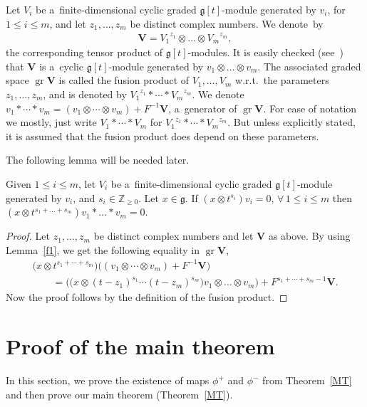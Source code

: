 \documentclass[pdftex]{sigma}
\DeclareMathOperator{\gr}{gr}
\numberwithin{equation}{section}
\begin{document}
Let $V_i$ be a~f\/inite-dimensional cyclic graded $\mathfrak{g}[t]$-module generated by $v_i$, for $1\leq i\leq m$, and
let $z_1,\dots,z_m$ be distinct complex numbers.
We denote~by
\begin{gather*}
\mathbf{V}={V_1}^{z_1}\otimes\dots\otimes {V_m}^{z_m},
\end{gather*}
the corresponding tensor product of $\mathfrak{g}[t]$-modules.
It is easily checked (see~\cite[Proposition 1.4]{FL}) that $\mathbf{V}$ is a~cyclic $\mathfrak{g}[t]$-module generated
by $v_1\otimes\dots\otimes v_m$.
The associated graded space $\gr \mathbf{V}$ is called the fusion product of $V_1,\dots,V_m$ w.r.t.\ the parameters
$z_1,\dots,z_m$, and is denoted by ${V_1}^{z_1}*\cdots*{V_m}^{z_m}$.
We denote $v_1*\cdots*v_m=(v_1\otimes\cdots\otimes v_m)+F^{-1}\mathbf{V}$, a~generator of $\gr \mathbf{V}$.
For ease of notation we mostly, just write $V_1*\cdots*V_m$ for ${V_1}^{z_1}*\cdots*{V_m}^{z_m}$.
But unless explicitly stated, it is assumed that the fusion product does depend on these parameters.

The following lemma will be needed later.
\begin{lemma}
\label{f2}
Given $1\leq i\leq m$, let $V_i$ be a~finite-dimensional cyclic graded $\mathfrak{g}[t]$-module generated by $v_i$, and
$s_i\in\mathbb{Z}_{\geq0}$.
Let $x\in\mathfrak{g}$.
If $(x\otimes t^{s_i})v_i=0$, $\forall\, 1\leq i\leq m$ then $(x\otimes t^{s_1+\dots+s_m}) v_1*\dots*v_m=0$.
\end{lemma}
\begin{proof}
Let $z_1,\dots,z_m$ be distinct complex numbers and let $\mathbf{V}$ as above.
By using Lemma~\ref{f1}, we get the following equality in $\gr \mathbf{V}$,
\begin{gather*}
\big(x\otimes t^{s_1+\cdots+s_m}\big) \big((v_1\otimes\cdots\otimes v_m)+F^{-1}\mathbf{V}\big)
\\
\qquad{}
=\big(\big(x\otimes (t-z_1)^{s_1}\cdots(t-z_m)^{s_m}\big)v_1\otimes\dots\otimes v_m\big) + F^{s_1+\cdots+s_m-1}\mathbf{V}.
\end{gather*}
Now the proof follows by the def\/inition of the fusion product.
\end{proof}

\section{Proof of the main theorem}\label{section4}

In this section, we prove the existence of maps $\phi^{+}$ and $\phi^{-}$ from Theorem~\ref{MT} and then prove our main
theorem (Theorem~\ref{MT}).
\end{document}
